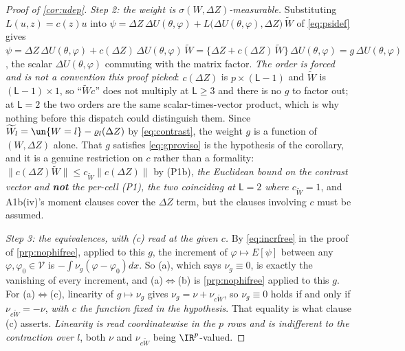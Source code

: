 \begin{proof}[Proof of \cref{cor:udep}]
\emph{Step 2: the weight is $\sigma(W,\Delta Z)$-measurable.}
Substituting $L(u,z)=c(z)u$ into
$\psi=\Delta Z\,\Delta U(\theta,\varphi)+L\big(\Delta U(\theta,\varphi),\Delta Z\big)\,\widetilde W$ of
\eqref{eq:psidef} gives
$\psi=\Delta Z\,\Delta U(\theta,\varphi)+c(\Delta Z)\,\Delta U(\theta,\varphi)\,\widetilde W
=\{\Delta Z+c(\Delta Z)\,\widetilde W\}\,\Delta U(\theta,\varphi)=g\,\Delta U(\theta,\varphi)$,
the scalar $\Delta U(\theta,\varphi)$ commuting with the matrix factor. \emph{The order is forced and is
not a convention this proof picked}: $c(\Delta Z)$ is $p\times(\mathsf L-1)$ and $\widetilde W$ is
$(\mathsf L-1)\times1$, so ``$\widetilde Wc$'' does not multiply at $\mathsf L\ge3$ and there is no $g$
to factor out; at $\mathsf L=2$ the two orders are the same scalar-times-vector product, which is why
nothing before this dispatch could distinguish them.
Since $\widetilde W_l=\un\{W=l\}-\varrho_l(\Delta Z)$ by \eqref{eq:contrast}, the weight $g$ is a function
of $(W,\Delta Z)$ alone. That
$g$ satisfies \eqref{eq:gproviso} is the hypothesis of the corollary, and it is a genuine restriction on
$c$ rather than a formality: $\big\|c(\Delta Z)\widetilde W\big\|\le c_{\widetilde W}\|c(\Delta Z)\|$ by
\textup{(P1b)}, \emph{the Euclidean bound on the contrast vector and \textbf{not} the per-cell
\textup{(P1)}, the two coinciding at $\mathsf L=2$ where $c_{\widetilde W}=1$}, and A1b(iv)'s moment
clauses cover the
$\Delta Z$ term, but the clauses involving $c$ must be assumed.

\emph{Step 3: the equivalences, with (c) read at the given $c$.}
By \eqref{eq:incrfree} in the proof of \cref{prp:nophifree}, applied to this $g$, the increment of
$\varphi\mapsto E[\psi]$ between any $\varphi,\varphi_0\in\mathcal V$ is $-\int\nu_g(\varphi-\varphi_0)dx$.
So (a), which says $\nu_g\equiv0$, is exactly the vanishing of every increment, and
(a)$\Leftrightarrow$(b) is \cref{prp:nophifree} applied to this $g$. For (a)$\Leftrightarrow$(c),
linearity of $g\mapsto\nu_g$ gives $\nu_g=\nu+\nu_{c\widetilde W}$, so $\nu_g\equiv0$ holds if and only
if $\nu_{c\widetilde W}=-\nu$, \emph{with $c$ the function fixed in the hypothesis}. That equality is
what clause (c) asserts. \emph{Linearity is read coordinatewise in the $p$ rows and is indifferent to the
contraction over $l$}, both $\nu$ and $\nu_{c\widetilde W}$ being $\IR^{p}$-valued.


\end{proof}
